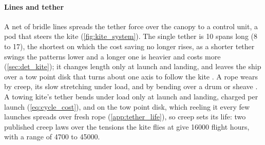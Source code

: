 \paragraph{Lines and tether} A net of bridle lines spreads the tether force over the canopy to a control unit, a pod that steers the kite (\cref{fig:kite_system}). The single tether is 10 spans long (8 to 17), the shortest on which the cost saving no longer rises, as a shorter tether swings the patterns lower and a longer one is heavier and costs more (\cref{sec:det_kite}); it changes length only at launch and landing, and leaves the ship over a tow point disk that turns about one axis to follow the kite \citep{skysails_patent_US11578697}. A rope wears by creep, its slow stretching under load, and by bending over a drum or sheave \citep{davies2015}. A towing kite's tether bends under load only at launch and landing, charged per launch (\cref{eq:cycle_cost}), and on the tow point disk, which reeling it every few launches spreads over fresh rope (\cref{app:tether_life}), so creep sets its life: two published creep laws \citep{bosman2013,humeau2018} over the tensions the kite flies at give \num{16000} flight hours, with a range of \num{4700} to \num{45000}.

